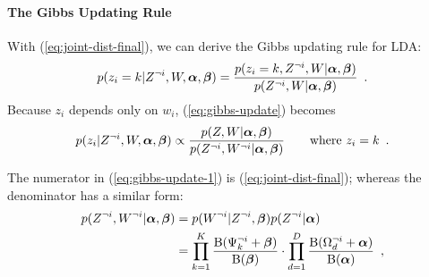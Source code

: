 \paragraph{The Gibbs Updating Rule}

With (\ref{eq:joint-dist-final}), we can derive the Gibbs updating
rule for LDA:
\begin{equation}
  \label{eq:gibbs-update}
  p(z_i=k|Z^{\neg i},W,\boldsymbol{\alpha},\boldsymbol{\beta})
  =
  \frac{
    p(z_i=k,Z^{\neg i},W|\boldsymbol{\alpha},\boldsymbol{\beta})
  }{
    p(Z^{\neg i},W|\boldsymbol{\alpha},\boldsymbol{\beta})
  }
  \enspace.
\end{equation}
Because $z_i$ depends only on $w_i$, (\ref{eq:gibbs-update}) becomes
\begin{equation}
  \label{eq:gibbs-update-1}
  p(z_i|Z^{\neg i},W,\boldsymbol{\alpha},\boldsymbol{\beta})
  \propto
  \frac{
    p(Z,W|\boldsymbol{\alpha},\boldsymbol{\beta})
  }{
    p(Z^{\neg i},W^{\neg i}|\boldsymbol{\alpha},\boldsymbol{\beta})
  }
  \qquad
  \text{where }
  z_i=k
  \enspace.
\end{equation}

The numerator in (\ref{eq:gibbs-update-1}) is
(\ref{eq:joint-dist-final}); whereas the denominator has a similar
form:
\begin{equation}
  \label{eq:gibbs-update-denominator}
  \begin{split}
    p(Z^{\neg i},W^{\neg i}|\boldsymbol{\alpha},\boldsymbol{\beta})
    &=
    p(W^{\neg i}|Z^{\neg i},\boldsymbol{\beta})
    p(Z^{\neg i}|\boldsymbol{\alpha})
    \\
    &=
    \prod_{k=1}^{K}
    \frac{\operatorname{B}(\Psi_{k}^{\neg i}+\boldsymbol{\beta})}{\operatorname{B}(\boldsymbol{\beta})}
    \cdot
    \prod_{d=1}^{D}
    \frac{\operatorname{B}(\Omega_{d}^{\neg i}+\boldsymbol{\alpha})}{\operatorname{B}(\boldsymbol{\alpha})}
    \enspace,
   \end{split}
\end{equation}

